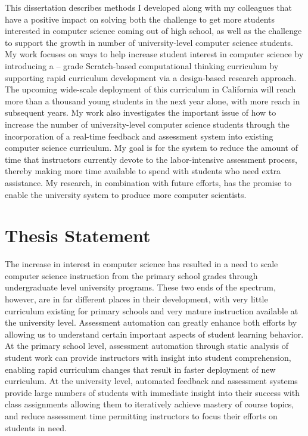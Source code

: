 This dissertation describes methods I developed along with my colleagues that
have a positive impact on solving both the challenge to get more students
interested in computer science coming out of high school, as well as the
challenge to support the growth in number of university-level computer science
students. My work focuses on ways to help increase student interest in computer
science by introducing a -- grade Scratch-based computational
thinking curriculum by supporting rapid curriculum development via a
design-based research approach. The upcoming wide-scale deployment of this
curriculum in California will reach more than a thousand young students in the
next year alone, with more reach in subsequent years. My work also investigates
the important issue of how to increase the number of university-level computer
science students through the incorporation of a real-time feedback and
assessment system into existing computer science curriculum. My goal is for the
system to reduce the amount of time that instructors currently devote to the
labor-intensive assessment process, thereby making more time available to spend
with students who need extra assistance. My research, in combination with
future efforts, has the promise to enable the university system to produce more
computer scientists.

\section{Thesis Statement}
The increase in interest in computer science has resulted in a need to scale
computer science instruction from the primary school grades through
undergraduate level university programs. These two ends of the spectrum,
however, are in far different places in their development, with very little
curriculum existing for primary schools and very mature instruction available
at the university level. Assessment automation can greatly enhance both efforts
by allowing us to understand certain important aspects of student learning
behavior. At the primary school level, assessment automation through static
analysis of student work can provide instructors with insight into student
comprehension, enabling rapid curriculum changes that result in faster
deployment of new curriculum. At the university level, automated feedback and
assessment systems provide large numbers of students with immediate insight
into their success with class assignments allowing them to iteratively achieve
mastery of course topics, and reduce assessment time permitting instructors to
focus their efforts on students in need.

